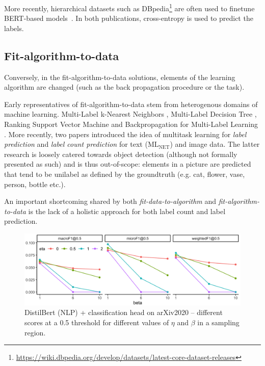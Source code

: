 More recently, hierarchical datasets such as
DBpedia\footnote{\url{https://wiki.dbpedia.org/develop/datasets/latest-core-dataset-releases}}
are often used to finetune BERT-based models~\cite{XLNet, bigBird}. In both
publications, cross-entropy is used to predict the labels.

\subsection{Fit-algorithm-to-data}
Conversely, in the fit-algorithm-to-data solutions, elements of the learning
algorithm are changed (such as the back propagation procedure or the task).

Early representatives of fit-algorithm-to-data stem from heterogenous domains
of machine learning. Multi-Label k-Nearest Neighbors \cite{ML-KNN},
Multi-Label Decision Tree \cite{ML-DT}, Ranking Support Vector Machine
\cite{multilabelSVM} and Backpropagation for Multi-Label Learning
\cite{multilabelBackprop}. More recently, two papers introduced the idea of
multitask learning for \emph{label prediction} and \emph{label count
prediction} for text (ML\(_{\text{NET}}\)) \cite{multitaskLabel} and image
\cite{multitaskLabelImages, tencent} data. The latter research is loosely
catered towards object detection (although not formally presented as such) and
is thus out-of-scope: elements in a picture are predicted that tend to be
unilabel as defined by the groundtruth (e.g. cat, flower, vase, person, bottle
etc.).

An important shortcoming shared by both \emph{fit-data-to-algorithm} and
\emph{fit-algorithm-to-data} is the lack of a holistic approach for both label
count and label prediction.

\begin{figure}[t!]
\centering
\includegraphics[width=.8\linewidth]{./images/betaEtaResized.png}
\vspace{.5\baselineskip}
\caption{\label{fig:betaEta}
DistilBert (NLP) + classification head on arXiv2020 – different scores at a 0.5 threshold for different values of $\eta$ and $\beta$ in a sampling region.}
\end{figure}

